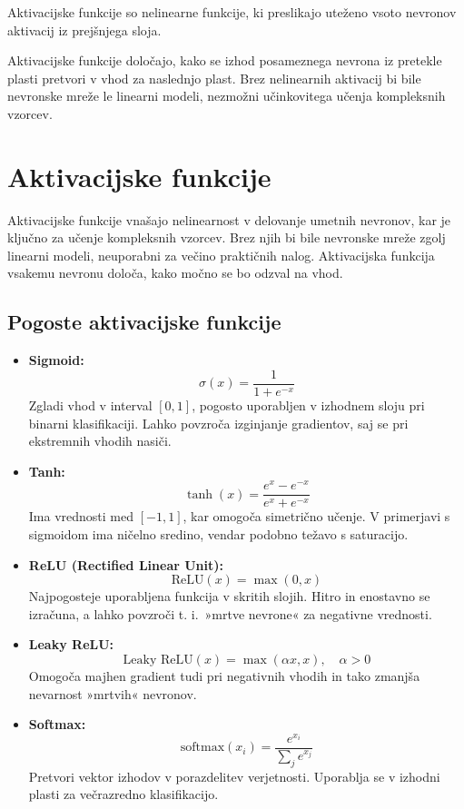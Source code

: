 Aktivacijske funkcije so nelinearne funkcije, ki preslikajo uteženo vsoto nevronov aktivacij iz prejšnjega sloja.

Aktivacijske funkcije določajo, kako se izhod posameznega nevrona iz pretekle plasti pretvori v vhod za naslednjo plast. Brez nelinearnih aktivacij bi bile nevronske mreže le linearni modeli, nezmožni učinkovitega učenja kompleksnih vzorcev.

\section*{Aktivacijske funkcije}

Aktivacijske funkcije vnašajo nelinearnost v delovanje umetnih nevronov, kar je ključno za učenje kompleksnih vzorcev. Brez njih bi bile nevronske mreže zgolj linearni modeli, neuporabni za večino praktičnih nalog. Aktivacijska funkcija vsakemu nevronu določa, kako močno se bo odzval na vhod.

\subsection*{Pogoste aktivacijske funkcije}

\begin{itemize}

  \item \textbf{Sigmoid:}
  \[
  \sigma(x) = \frac{1}{1 + e^{-x}}
  \]
  Zgladi vhod v interval $[0, 1]$, pogosto uporabljen v izhodnem sloju pri binarni klasifikaciji. Lahko povzroča izginjanje gradientov, saj se pri ekstremnih vhodih nasiči.

  \item \textbf{Tanh:}
  \[
  \tanh(x) = \frac{e^x - e^{-x}}{e^x + e^{-x}}
  \]
  Ima vrednosti med $[-1, 1]$, kar omogoča simetrično učenje. V primerjavi s sigmoidom ima ničelno sredino, vendar podobno težavo s saturacijo.

  \item \textbf{ReLU (Rectified Linear Unit):}
  \[
  \text{ReLU}(x) = \max(0, x)
  \]
  Najpogosteje uporabljena funkcija v skritih slojih. Hitro in enostavno se izračuna, a lahko povzroči t. i.\ »mrtve nevrone« za negativne vrednosti.

  \item \textbf{Leaky ReLU:}
  \[
  \text{Leaky ReLU}(x) = \max(\alpha x, x), \quad \alpha > 0
  \]
  Omogoča majhen gradient tudi pri negativnih vhodih in tako zmanjša nevarnost »mrtvih« nevronov.

  \item \textbf{Softmax:}
  \[
  \text{softmax}(x_i) = \frac{e^{x_i}}{\sum_j e^{x_j}}
  \]
  Pretvori vektor izhodov v porazdelitev verjetnosti. Uporablja se v izhodni plasti za večrazredno klasifikacijo.

\end{itemize}


